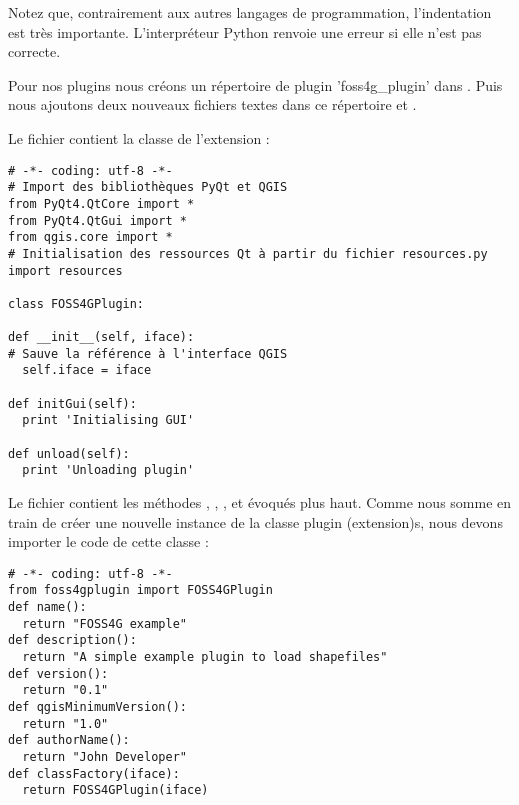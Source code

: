 Notez que, contrairement aux autres langages de programmation, l'indentation est
très importante. L'interpréteur Python renvoie une erreur si elle n'est pas
correcte.

Pour nos plugins nous  créons un répertoire de plugin 'foss4g\_plugin' dans
. Puis nous ajoutons deux nouveaux
fichiers textes dans ce répertoire  et
.

Le fichier  contient la classe de l'extension :

\begin{verbatim}
# -*- coding: utf-8 -*-
# Import des bibliothèques PyQt et QGIS
from PyQt4.QtCore import *
from PyQt4.QtGui import *
from qgis.core import *
# Initialisation des ressources Qt à partir du fichier resources.py
import resources

class FOSS4GPlugin:

def __init__(self, iface):
# Sauve la référence à l'interface QGIS
  self.iface = iface

def initGui(self):
  print 'Initialising GUI'

def unload(self):
  print 'Unloading plugin'
\end{verbatim}

Le fichier  contient les méthodes ,
, , 
et  évoqués plus haut. Comme nous somme en train de créer
une nouvelle instance de la classe plugin (extension)s, nous devons importer le code de cette
classe :

\begin{verbatim}
# -*- coding: utf-8 -*-
from foss4gplugin import FOSS4GPlugin
def name():
  return "FOSS4G example"
def description():
  return "A simple example plugin to load shapefiles"
def version():
  return "0.1"
def qgisMinimumVersion():
  return "1.0"
def authorName():
  return "John Developer"
def classFactory(iface):
  return FOSS4GPlugin(iface)
\end{verbatim}

